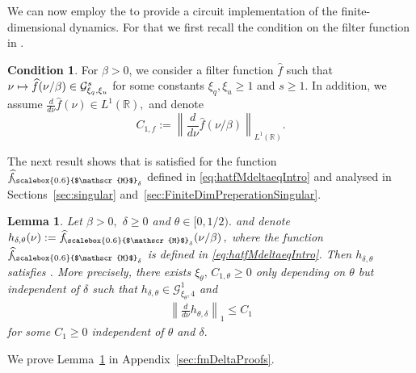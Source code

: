 \documentclass[11pt]{amsart}
\newcommand{\1}{\mathbbm{1}}
\newcommand{\hatfMdelta}{\widehat{f}_{\!\scalebox{0.6}{$\mathscr{M}$}_\delta}}
\theoremstyle{plain}
\newtheorem{lemma}[theorem]{Lemma}
\theoremstyle{definition}
\newtheorem{condition}[theorem]{Condition}
\theoremstyle{remark}
\numberwithin{equation}{section}
\begin{document}
We can now employ the \cite[Theorem 18]{ding2025efficient} to provide a circuit implementation of the finite-dimensional dynamics. For that we first recall the condition on the filter function in \cite[Assumption 13]{ding2025efficient}.



\begin{condition} \label{condfgevrey}
For $\beta > 0$, we consider a filter function $\widehat{f}$ such that $\nu\mapsto \widehat{f}(\nu/\beta)\in   \mathcal{G}^s_{\smash{\xi_q,\xi_u}}$ for some constants $\xi_q,\xi_u \ge 1$ and $s \ge 1$. In addition, we assume
$
\frac{d}{d\nu}\widehat{f}(\nu) \in L^1(\mathbb{R}),
$
and denote
\[
C_{1,f}
:=
\left\|
\frac{d}{d\nu}\widehat{f}(\nu/\beta)
\right\|_{L^1(\mathbb{R})}.
\]
\end{condition} 


\noindent The next result shows that  is satisfied for the function $\hatfMdelta$ defined in \eqref{eq:hatfMdeltaeqIntro} and analysed in Sections~\ref{sec:singular} and~\ref{sec:FiniteDimPreperationSingular}.

\begin{lemma}
\label{LemmGevreycond}
Let $\beta>0,$ $\delta\ge 0$ and $\theta\in [0,1/2).$ and denote
$
h_{\delta,\theta}(\nu)
:=
\hatfMdelta\!\left(\nu/\beta\right),$ where the function $\hatfMdelta$ is defined in \eqref{eq:hatfMdeltaeqIntro}. Then \(h_{\delta,\theta}\) satisfies . More precisely, there exists $\xi_{\theta},\, C_{1,\theta}\ge 0$ only depending on $\theta$ but independent of $\delta$ such that \(h_{\delta,\theta}\in \mathcal G^1_{\xi_\theta,4}\) and 
\begin{align*}
\left\|\frac{d}{d\nu} h_{\theta,\delta}\right\|_1 \le C_{1}
\end{align*}
for some $C_1\ge 0$ independent of $\theta$ and $\delta.$
\end{lemma}
We prove Lemma~\ref{LemmGevreycond} in Appendix~\ref{sec:fmDeltaProofs}.
\end{document}
